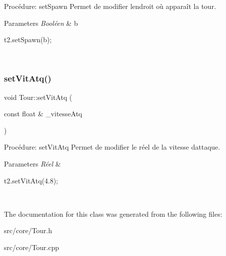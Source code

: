 Procédure\+: set\+Spawn Permet de modifier l\textquotesingle{}endroit où apparaît la tour. 


\begin{DoxyParams}{Parameters}
{\em Booléen} & b 
\begin{DoxyCode}
t2.setSpawn(b);
\end{DoxyCode}
 \\
\hline
\end{DoxyParams}
\mbox{\label{classTour_a110c73fc4160189cdafbb700f3999a39}} 
\subsubsection{\texorpdfstring{set\+Vit\+Atq()}{setVitAtq()}}
{\footnotesize\ttfamily void Tour\+::set\+Vit\+Atq (\begin{DoxyParamCaption}\item[{const float \&}]{\+\_\+vitesse\+Atq }\end{DoxyParamCaption})}



Procédure\+: set\+Vit\+Atq Permet de modifier le réel de la vitesse d\textquotesingle{}attaque. 


\begin{DoxyParams}{Parameters}
{\em Réel} & 
\begin{DoxyCode}
t2.setVitAtq(4.8);
\end{DoxyCode}
 \\
\hline
\end{DoxyParams}


The documentation for this class was generated from the following files\+:\begin{DoxyCompactItemize}
\item 
src/core/Tour.\+h\item 
src/core/Tour.\+cpp\end{DoxyCompactItemize}
